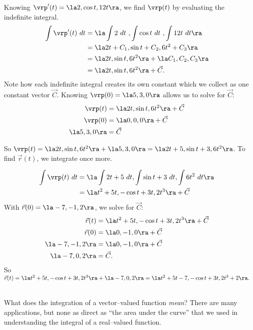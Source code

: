 {Knowing $\vrp'(t) = \la 2,\cos t, 12t\ra$, we find $\vrp(t)$ by evaluating the indefinite integral.
\begin{align*}
\int \vrp'(t)\ dt &= \la \int 2\ dt\ , \int \cos t\ dt\ , \int 12t\ dt\ra \\
						&= \la 2t+C_1, \sin t+ C_2, 6t^2 + C_3\ra \\
						&= \la 2t,\sin t,6t^2 \ra + \la C_1,C_2,C_3\ra \\
						&= \la 2t,\sin t,6t^2 \ra + \vec C.
\end{align*}
Note how each indefinite integral creates its own constant which we collect as one constant vector $\vec C$. Knowing $\vrp(0) = \la 5,3,0\ra$ allows us to solve for $\vec C$:
\begin{align*}
\vrp(t) & = \la 2t,\sin t,6t^2 \ra + \vec C\\
\vrp(0) &=   \la 0,0,0 \ra + \vec C\\
\la 5,3,0\ra &= \vec C
\end{align*}

So $\vrp(t) = \la 2t,\sin t,6t^2\ra + \la 5,3,0\ra = \la 2t+5, \sin t + 3, 6t^2\ra$. To find $\vec r(t)$, we integrate once more.

\begin{align*}
\int \vrp(t)\ dt &= \la \int 2t+5\ dt, \int \sin t + 3\ dt, \int 6t^2\ dt \ra\\
							&= \la t^2+5t, -\cos t + 3t, 2t^3\ra + \vec C
\end{align*}
With $\vec r(0) = \la -7,-1,2\ra$, we solve for $\vec C$:
\begin{align*}
\vec r(t) &= \la t^2+5t, -\cos t + 3t, 2t^3\ra + \vec C\\
\vec r(0) &= \la 0,-1,0\ra + \vec C\\
\la -7,-1,2\ra &= \la 0,-1,0\ra + \vec C\\
\la -7,0,2\ra &= \vec C.
\end{align*}
So $\vec r(t) = \la t^2+5t, -\cos t + 3t, 2t^3\ra + \la -7,0,2\ra = \la t^2+5t-7,-\cos t+3t,2t^3+2\ra.$
}\\

What does the integration of a vector--valued function \emph{mean}? There are many applications, but none as direct as ``the area under the curve'' that we used in understanding the integral of a real--valued function.

